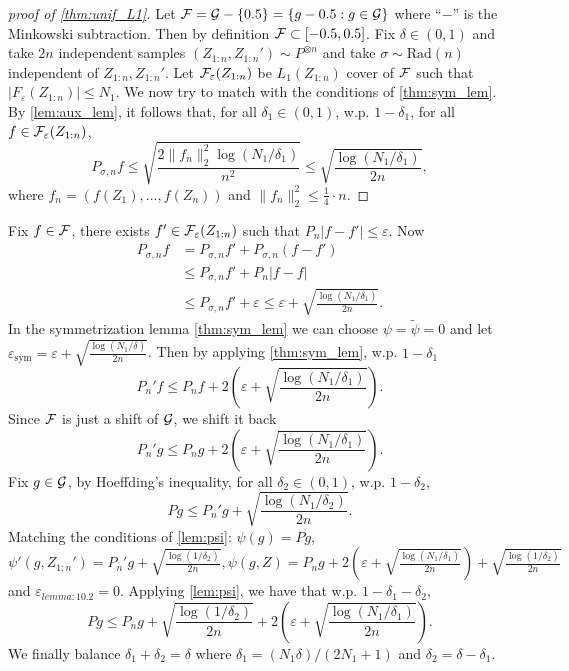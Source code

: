 \documentclass[twoside]{article}
\newcommand{\Fc}{\cF_\varepsilon(Z_{1:n})}
\begin{document}
 \begin{proof}[proof of \cref{thm:unif_L1}]
    Let $\mathcal{F}=\mathcal{G}-\{0.5\}=\{g-0.5:g\in \mathcal{G}\}$ where ``$-$'' is the Minkowski subtraction. Then by definition $\mathcal{F}\subset [-0.5,0.5]$. Fix $\delta\in (0,1)$ and take $2n$ independent samples $(Z_{1:n},Z_{1:n}')\sim P^{\otimes n}$ and take $\sigma\sim \mathrm{Rad}(n)$ independent of $Z_{1:n}, Z_{1:n}'$. Let $\mathcal{F}_\varepsilon(Z_{1:n})$ be $L_1(Z_{1:n})$ cover of $\mathcal{F}$ such that $|F_\varepsilon(Z_{1:n})|\le N_1$. We now try to match with the conditions of \cref{thm:sym_lem}. By \cref{lem:aux_lem}, it follows that, for all $\delta_1\in (0,1)$, w.p. $1-\delta_1$, for all $f\in \mathcal{F}_\varepsilon(Z_{1:n})$,
    \begin{equation*}
        P_{\sigma,n}f \le \sqrt{\frac{2\|f_n\|_2^2\log(N_1/\delta_1)}{n^2}}\le \sqrt{\frac{\log(N_1/\delta_1)}{2n}},
    \end{equation*}
    where $f_n=(f(Z_1),...,f(Z_n))$ and $\|f_n\|_2^2\le \frac{1}{4}\cdot n$.
 \end{proof}
 Fix $f\in \mathcal{F}$, there exists $f'\in \Fc$ such that $P_n|f-f'|\le \varepsilon$. Now 
 \begin{align*}
    P_{\sigma,n}f&= P_{\sigma, n}f'+P_{\sigma,n}(f-f')\\
    &\le P_{\sigma,n}f'+P_n|f-f|\\
    &\le P_{\sigma,n}f'+\varepsilon\le \varepsilon+\sqrt{\frac{\log(N_1/\delta_1)}{2n}}.
 \end{align*}
 In the symmetrization lemma \cref{thm:sym_lem} we can choose $\psi=\tilde \psi=0$ and let $\varepsilon_{\text{sym}}=\varepsilon+\sqrt{\frac{\log(N_1/\delta)}{2n}}$. Then by applying \cref{thm:sym_lem}, w.p. $1-\delta_1$
 \[P_n'f\le P_nf + 2\left(\varepsilon+\sqrt{\frac{\log(N_1/\delta_1)}{2n}}\right).\]
 Since $\mathcal{F}$ is just a shift of $\mathcal{G}$, we shift it back
 \[P_n'g\le P_ng + 2\left(\varepsilon+\sqrt{\frac{\log(N_1/\delta_1)}{2n}}\right).\]
 Fix $g\in \mathcal{G}$, by Hoeffding's inequality, for all $\delta_2\in (0,1)$, w.p. $1-\delta_2$,
 \begin{equation*}
    Pg\le P_n'g+\sqrt{\frac{\log(N_1/\delta_2)}{2n}}.
 \end{equation*}
 Matching the conditions of \cref{lem:psi}: $\psi(g)=Pg$, $\psi'(g,Z_{1:n}')=P_n'g+\sqrt{\frac{\log(1/\delta_2)}{2n}},\psi(g,Z)=P_ng+2\left(\varepsilon+\sqrt{\frac{\log(N_1/\delta_1)}{2n}}\right)+\sqrt{\frac{\log(1/\delta_2)}{2n}}$ and $\varepsilon_{lemma:10.2}=0$. Applying \cref{lem:psi}, we have that w.p. $1-\delta_1-\delta_2$,
 \begin{equation*}
    Pg \le P_ng +\sqrt{\frac{\log(1/\delta_2)}{2n}}+2\left(\varepsilon+\sqrt{\frac{\log(N_1/\delta_1)}{2n}}\right).
 \end{equation*}
We finally balance $\delta_1+\delta_2=\delta$ where $\delta_1=(N_1\delta)/(2N_1+1)$ and $\delta_2=\delta-\delta_1$.
\end{document}
